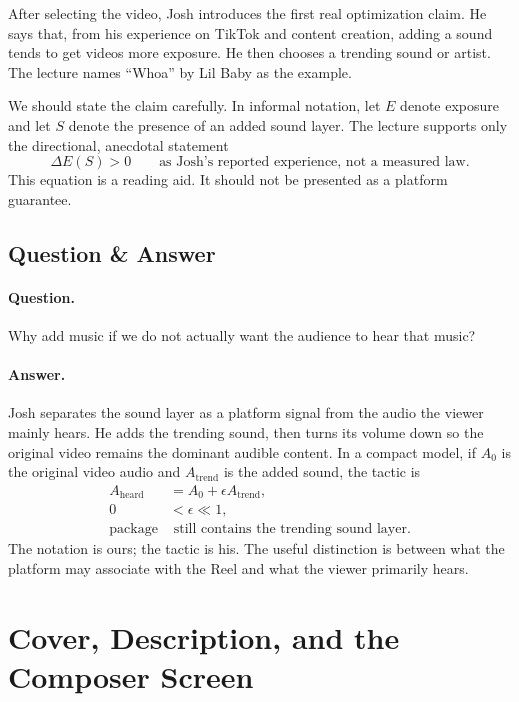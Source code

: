 After selecting the video, Josh introduces the first real optimization claim. He says that, from his experience on TikTok and content creation, adding a sound tends to get videos more exposure. He then chooses a trending sound or artist. The lecture names ``Whoa'' by Lil Baby as the example.

We should state the claim carefully. In informal notation, let \(E\) denote exposure and let \(S\) denote the presence of an added sound layer. The lecture supports only the directional, anecdotal statement
\begin{equation}
\Delta E(S) > 0
\qquad
\text{as Josh's reported experience, not a measured law.}
\end{equation}
This equation is a reading aid. It should not be presented as a platform guarantee.

\subsection{Question \& Answer}

\paragraph{Question.}
Why add music if we do not actually want the audience to hear that music?

\paragraph{Answer.}
Josh separates the sound layer as a platform signal from the audio the viewer mainly hears. He adds the trending sound, then turns its volume down so the original video remains the dominant audible content. In a compact model, if \(A_0\) is the original video audio and \(A_{\mathrm{trend}}\) is the added sound, the tactic is
\begin{align}
A_{\mathrm{heard}} &= A_0 + \epsilon A_{\mathrm{trend}}, \\
0 &< \epsilon \ll 1, \\
\mathrm{package} &\text{ still contains the trending sound layer.}
\end{align}
The notation is ours; the tactic is his. The useful distinction is between what the platform may associate with the Reel and what the viewer primarily hears.

\section{Cover, Description, and the Composer Screen}

